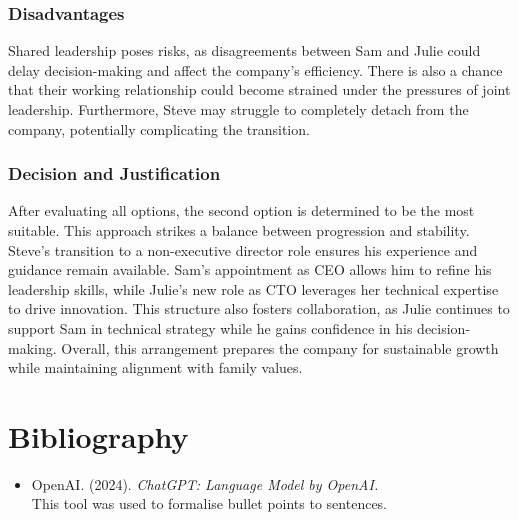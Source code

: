 \documentclass[a4paper,10pt]{article}
\begin{document}
\subsubsection*{Disadvantages}
Shared leadership poses risks, as disagreements between Sam and Julie could delay decision-making and affect the company’s efficiency. There is also a chance that their working relationship could become strained under the pressures of joint leadership. Furthermore, Steve may struggle to completely detach from the company, potentially complicating the transition.

\subsubsection*{Decision and Justification}

After evaluating all options, the second option is determined to be the most suitable. This approach strikes a balance between progression and stability. Steve’s transition to a non-executive director role ensures his experience and guidance remain available. Sam’s appointment as CEO allows him to refine his leadership skills, while Julie’s new role as CTO leverages her technical expertise to drive innovation. This structure also fosters collaboration, as Julie continues to support Sam in technical strategy while he gains confidence in his decision-making. Overall, this arrangement prepares the company for sustainable growth while maintaining alignment with family values.

\section*{Bibliography}\nocite{*}

\begin{itemize}
    \item OpenAI. (2024). \textit{ChatGPT: Language Model by OpenAI.} \\ 
    This tool was used to formalise bullet points to sentences.
\end{itemize}

\pagebreak
\end{document}
